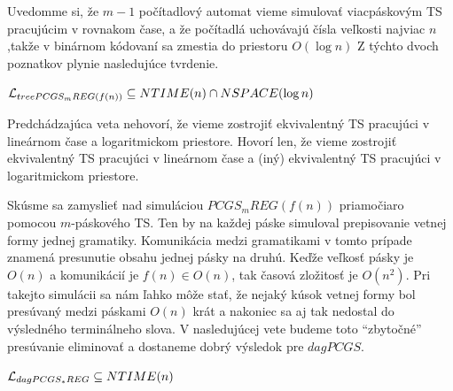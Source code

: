 \medskip

Uvedomme si, že $m-1$ počítadlový automat vieme simulovať
viacpáskovým TS pracujúcim v rovnakom čase, a že počítadlá
uchovávajú čísla veľkosti najviac $n$,takže v binárnom kódovaní sa
zmestia do priestoru $O(\log n)$ Z týchto dvoch poznatkov plynie
nasledujúce tvrdenie.

\begin{veta}
  $\mathcal{L}_{treePCGS_m REG(f(n))}\subseteq NTIME(n)\cap NSPACE(\log
  n)$
\end{veta}

\begin{poznamka}
  Predchádzajúca veta nehovorí, že vieme zostrojiť ekvivalentný TS
  pracujúci v lineárnom čase a logaritmickom priestore. Hovorí len,
  že vieme zostrojiť ekvivalentný TS pracujúci v lineárnom čase a
  (iný) ekvivalentný TS pracujúci v logaritmickom priestore.
\end{poznamka}

Skúsme sa zamyslieť nad simuláciou $PCGS_mREG(f(n))$ priamočiaro
pomocou $m$-páskového TS. Ten by na každej páske simuloval
prepisovanie vetnej formy jednej gramatiky. Komunikácia medzi
gramatikami v tomto prípade znamená presunutie obsahu jednej pásky
na druhú. Keďže veľkosť pásky je $O(n)$ a komunikácií je $f(n)\in
O(n)$, tak časová zložitosť je $O(n^2)$. Pri takejto simulácii sa
nám ľahko môže stať, že nejaký kúsok vetnej formy bol presúvaný
medzi páskami $O(n)$ krát a nakoniec sa aj tak nedostal do
výsledného terminálneho slova. V nasledujúcej vete budeme toto
``zbytočné'' presúvanie eliminovať a dostaneme dobrý výsledok pre
$dagPCGS$.

\begin{veta}
  $\mathcal{L}_{dagPCGS_* REG} \subseteq NTIME(n)$
\end{veta}

